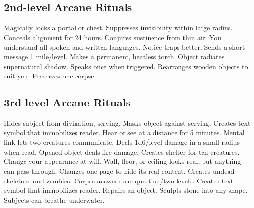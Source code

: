 \subsection{2nd-level Arcane Rituals}
\begin{rituallist}
     Magically locks a portal or chest.
     Suppresses invisibility within large radius.
     Conceals alignment for 24 hours.
     Conjures sustinence from thin air.
     You understand all spoken and written languages.
     Notice traps better.
     Sends a short message 1 mile/level.
     Makes a permanent, heatless torch.
     Object radiates supernatural shadow.
     Speaks once when triggered.
     Rearranges wooden objects to suit you.
     Preserves one corpse.
\end{rituallist}

\subsection{3rd-level Arcane Rituals}
\begin{rituallist}
     Hides subject from divination, scrying.
     Masks object against scrying.
     Creates text symbol that immobilizes reader.
     Hear or see at a distance for 5 minutes.
     Mental link lets two creatures communicate.
     Deals 1d6/level damage in a small radius when read.
     Opened object deals fire damage.
     Creates shelter for ten creatures.
     Change your appearance at will.
     Wall, floor, or ceiling looks real, but anything can pass through.
     Changes one page to hide its real content.
     Creates undead skeletons and zombies.
     Corpse answers one question/two levels.
     Creates text symbol that immobilizes reader.
     Repairs an object.
     Sculpts stone into any shape.
     Subjects can breathe underwater.
\end{rituallist}

